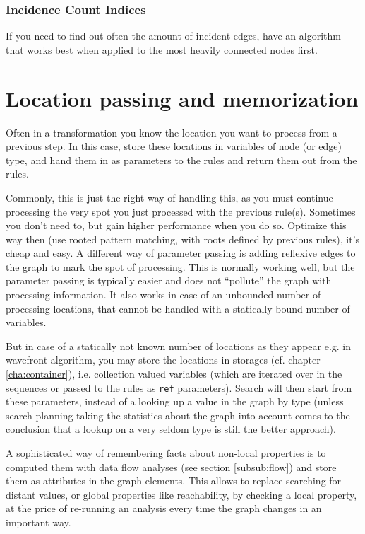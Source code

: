 \subsubsection*{Incidence Count Indices}
If you need to find out often the amount of incident edges, have an algorithm that works best when applied to the most heavily connected nodes first.


\section{Location passing and memorization}
Often in a transformation you know the location you want to process from a previous step.
In this case, store these locations in variables of node (or edge) type, and hand them in as parameters to the rules and return them out from the rules.

Commonly, this is just the right way of handling this, 
as you must continue processing the very spot you just processed with the previous rule(s).
Sometimes you don't need to, but gain higher performance when you do so.
Optimize this way then (use rooted pattern matching, with roots defined by previous rules), it's cheap and easy.
A different way of parameter passing is adding reflexive edges to the graph to mark the spot of processing.
This is normally working well, but the parameter passing is typically easier and does not "`pollute"' the graph with processing information.
It also works in case of an unbounded number of processing locations, that cannot be handled with a statically bound number of variables.

But in case of a statically not known number of locations as they appear e.g. in wavefront algorithm, you may store the locations in storages (cf. chapter \ref{cha:container}), i.e. collection valued variables (which are iterated over in the sequences or passed to the rules as \texttt{ref} parameters).
Search will then start from these parameters, instead of a looking up a value in the graph by type (unless search planning taking the statistics about the graph into account comes to the conclusion  that a lookup on a very seldom type is still the better approach).

A sophisticated way of remembering facts about non-local properties is to computed them with data flow analyses (see section \ref{subsub:flow}) and store them as attributes in the graph elements.
This allows to replace searching for distant values, or global properties like reachability, by checking a local property, at the price of re-running an analysis every time the graph changes in an important way.

